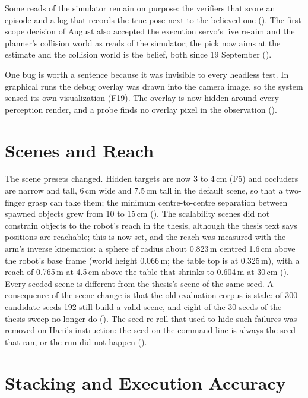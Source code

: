 Some reads of the simulator remain on purpose: the verifiers that score an
episode and a log that records the true pose next to the believed one ().
The first scope decision of August also accepted the execution servo's live re-aim
and the planner's collision world as reads of the simulator; the pick now aims at
the estimate and the collision world is the belief, both since 19 September
().

One bug is worth a sentence because it was invisible to every headless test. In
graphical runs the debug overlay was drawn into the camera image, so the system
sensed its own visualization (F19). The overlay is now hidden around every
perception render, and a probe finds no overlay pixel in the observation
().

\section{Scenes and Reach}
\label{sec:scenes}

The scene presets changed. Hidden targets are now 3 to 4\,cm (F5) and occluders are
narrow and tall, 6\,cm wide and 7.5\,cm tall in the default scene, so that a
two-finger grasp can take them; the
minimum centre-to-centre separation between spawned objects grew from 10 to
15\,cm (). The scalability scenes did not constrain objects to the robot's reach in
the thesis, although the thesis text says positions are reachable; this
is now set, and the reach was measured with the arm's inverse kinematics: a sphere
of radius about 0.823\,m centred 1.6\,cm above the robot's base frame (world height
0.066\,m; the table top is at 0.325\,m), with a reach of 0.765\,m at 4.5\,cm above
the table that shrinks to 0.604\,m at 30\,cm ().
Every seeded scene is different from the thesis's scene of the same seed. A
consequence of the scene change is that the old evaluation corpus is stale: of 300
candidate seeds 192 still build a valid scene, and eight of the 30 seeds of the
thesis sweep no longer do (). The seed re-roll that used to hide such
failures was removed on Hani's instruction: the seed on the command line is
always the seed that ran, or the run did not happen ().

\section{Stacking and Execution Accuracy}
\label{sec:stacking}

